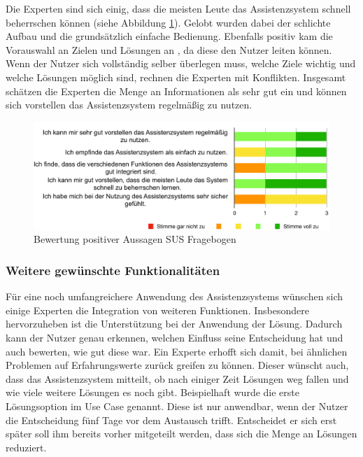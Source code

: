 Die Experten sind sich einig, dass die meisten Leute das Assistenzsystem schnell beherrschen können (siehe Abbildung \ref{pic:SUS-positiv}). Gelobt wurden dabei der schlichte Aufbau und die grundsätzlich einfache Bedienung. Ebenfalls positiv kam die Vorauswahl an Zielen und Lösungen an , da diese den Nutzer leiten können. Wenn der Nutzer sich vollständig selber überlegen muss, welche Ziele wichtig und welche Lösungen möglich sind, rechnen die Experten mit Konflikten. Insgesamt schätzen die Experten die Menge an Informationen als sehr gut ein und können sich vorstellen das Assistenzsystem regelmäßig zu nutzen.
\begin{figure}[htb]
\centering
\includegraphics[scale=0.65]{DA_files/Bilder/Validierung/Bild-positive_Aussagen.pdf}
\caption{Bewertung positiver Aussagen SUS Fragebogen}
\label{pic:SUS-positiv}
\end{figure}

\subsubsection*{Weitere gewünschte Funktionalitäten}
Für eine noch umfangreichere Anwendung des Assistenzsystems wünschen sich einige Experten die Integration von weiteren Funktionen. Insbesondere hervorzuheben ist die Unterstützung bei der Anwendung der Lösung. Dadurch kann der Nutzer genau erkennen, welchen Einfluss seine Entscheidung hat und auch bewerten, wie gut diese war. Ein Experte erhofft sich damit, bei ähnlichen Problemen auf Erfahrungswerte zurück greifen zu können. Dieser wünscht auch, dass das Assistenzsystem mitteilt, ob nach einiger Zeit Lösungen weg fallen und wie viele weitere Lösungen es noch gibt. Beispielhaft wurde die erste Lösungsoption im Use Case genannt. Diese ist nur anwendbar, wenn der Nutzer die Entscheidung fünf Tage vor dem Austausch trifft. Entscheidet er sich erst später soll ihm bereits vorher mitgeteilt werden, dass sich die Menge an Lösungen reduziert. 

